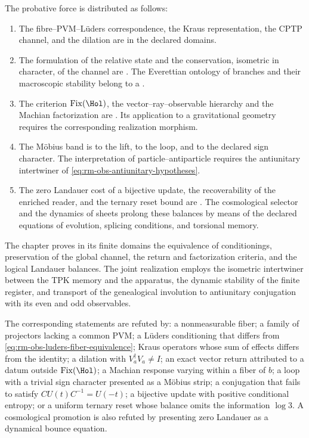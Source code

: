 The probative force is distributed as follows:
\begin{enumerate}[label=\textup{(\roman*)}]
 \item The fibre--PVM--Lüders correspondence, the Kraus representation,
 the CPTP channel, and the dilation are
  in the declared domains.
 \item The formulation of the relative state and the conservation, isometric in character,
 of the channel are . The Everettian ontology of branches and their
 macroscopic stability belong to a
 .
 \item The criterion
 \(\operatorname{Fix}(\Hol)\), the vector--ray--observable hierarchy
 and the Machian factorization are
 . Its application to a gravitational geometry
 requires the corresponding realization morphism.
 \item The Möbius band is  to the
 lift, to the loop, and to the declared sign character. The
 interpretation of particle--antiparticle requires the antiunitary intertwiner
 of \cref{eq:rm-obs-antiunitary-hypotheses}.
 \item The zero Landauer cost of a bijective update, the recoverability
 of the enriched reader, and the ternary reset bound are
 . The cosmological selector and the
 dynamics of sheets prolong these balances by means of the declared equations of
 evolution, splicing conditions, and torsional memory.
\end{enumerate}

\begin{proofstatusbox}
The chapter proves in its finite domains the equivalence of conditionings, preservation of the global channel, the return and factorization criteria, and the logical Landauer balances. The joint realization employs the isometric intertwiner between the TPK memory and the apparatus, the dynamic stability of the finite register, and transport of the genealogical involution to antiunitary conjugation with its even and odd observables.
\end{proofstatusbox}

\begin{falsifierbox}
The corresponding statements are refuted by: a nonmeasurable fiber; a family
of projectors lacking a common PVM; a Lüders conditioning
that differs from \cref{eq:rm-obs-luders-fiber-equivalence}; Kraus
operators whose sum of effects differs from the identity; a dilation with
\(V_a^\dagger V_a\neq I\); an exact vector return attributed to a datum
outside \(\operatorname{Fix}(\Hol)\); a Machian response varying within a
fiber of \(b\); a loop with a trivial sign character presented as a Möbius
strip; a conjugation that fails to satisfy
\(CU(t)C^{-1}=U(-t)\); a bijective update with positive conditional
entropy; or a uniform ternary reset whose balance omits the
information \(\log3\). A cosmological promotion is also refuted by
presenting zero Landauer as a dynamical bounce equation.
\end{falsifierbox}
